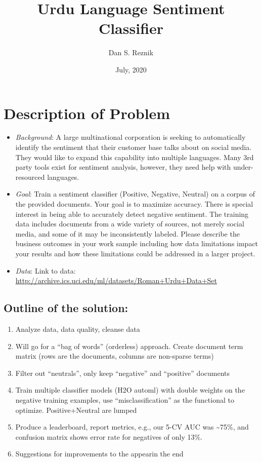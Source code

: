 \documentclass[
]{article}
\title{Urdu Language Sentiment Classifier}
\author{Dan S. Reznik}
\date{July, 2020}
\providecommand{\tightlist}{%
  \setlength{\itemsep}{0pt}\setlength{\parskip}{0pt}}
\begin{document}
\maketitle

{
\setcounter{tocdepth}{2}
\tableofcontents
}
\hypertarget{description-of-problem}{%
\section{Description of Problem}\label{description-of-problem}}

\begin{itemize}
\item
  \emph{Background}: A large multinational corporation is seeking to
  automatically identify the sentiment that their customer base talks
  about on social media. They would like to expand this capability into
  multiple languages. Many 3rd party tools exist for sentiment analysis,
  however, they need help with under-resourced languages.
\item
  \emph{Goal}: Train a sentiment classifier (Positive, Negative,
  Neutral) on a corpus of the provided documents. Your goal is to
  maximize accuracy. There is special interest in being able to
  accurately detect negative sentiment. The training data includes
  documents from a wide variety of sources, not merely social media, and
  some of it may be inconsistently labeled. Please describe the business
  outcomes in your work sample including how data limitations impact
  your results and how these limitations could be addressed in a larger
  project.
\item
  \emph{Data}: Link to data:
  \url{http://archive.ics.uci.edu/ml/datasets/Roman+Urdu+Data+Set}
\end{itemize}

\hypertarget{outline-of-the-solution}{%
\subsection{Outline of the solution:}\label{outline-of-the-solution}}

\begin{enumerate}
\def\labelenumi{\arabic{enumi}.}
\tightlist
\item
  Analyze data, data quality, cleanse data
\item
  Will go for a ``bag of words'' (orderless) approach. Create document
  term matrix (rows are the documents, columns are non-sparse terms)
\item
  Filter out ``neutrals'', only keep ``negative'' and ``positive''
  documents
\item
  Train multiple classifier models (H2O automl) with double weights on
  the negative training examples, use ``misclassification'' as the
  functional to optimize. Positive+Neutral are lumped
\item
  Produce a leaderboard, report metrics, e.g., our 5-CV AUC was
  \textasciitilde75\%, and confusion matrix shows error rate for
  negatives of only 13\%.
\item
  Suggestions for improvements to the appearin the end
\end{enumerate}
\end{document}

